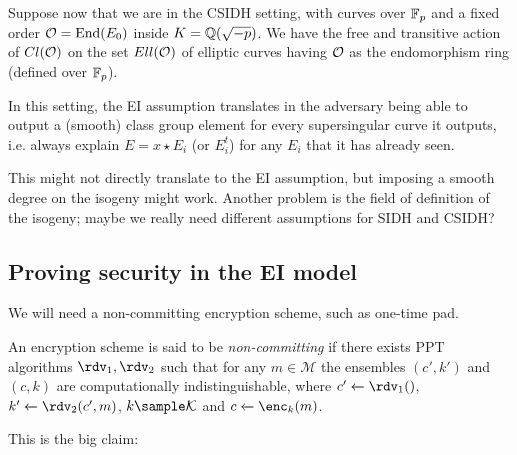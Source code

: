 Suppose now that we are in the CSIDH setting, with curves over $\mathbb{F}_p$ and a fixed order $\mathcal{O}=\operatorname{End}(E_0)$ inside $K=\mathbb{Q}(\sqrt{-p})$. We have the free and transitive action of $Cl(\mathcal{O})$ on the set $Ell(\mathcal{O})$ of elliptic curves having $\mathcal{O}$ as the endomorphism ring (defined over $\mathbb{F}_p$).

In this setting, the EI assumption translates in the adversary being able to output a (smooth) class group element for every supersingular curve it outputs, i.e. always explain $E=x\star E_i$ (or $E_i^t$) for any $E_i$ that it has already seen.

{\color{red} This might not directly translate to the EI assumption, but imposing a smooth degree on the isogeny might work. Another problem is the field of definition of the isogeny; maybe we really need different assumptions for SIDH and CSIDH?}

\subsection{Proving security in the EI model}
We will need a non-committing encryption scheme, such as one-time pad.
\begin{definition}
    An encryption scheme is said to be \emph{non-committing} if there exists PPT algorithms $\rdv_1,\rdv_2$ such that for any $m\in\mathcal M$ the ensembles $(c',k')$ and $(c,k)$ are computationally indistinguishable, where $c'\xleftarrow{}\rdv_1()$, $k'\xleftarrow{}\rdv_2(c', m)$, $k\sample\mathcal K$ and $c\xleftarrow{}\enc_k(m)$.
\end{definition}

This is the big claim:

